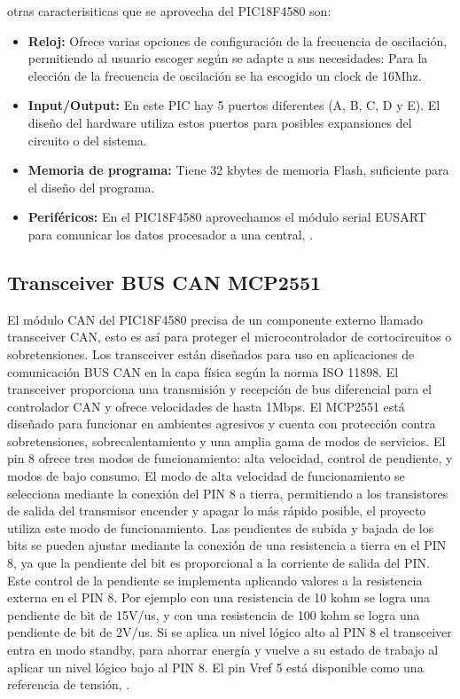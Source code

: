 otras caracterisiticas que se aprovecha del PIC18F4580 son: 
\begin{itemize}
\item {\textbf{Reloj:}} Ofrece varias opciones de configuración de la frecuencia de oscilación, permitiendo al usuario escoger según se adapte a sus necesidades:
Para la elección de la frecuencia de oscilación se ha escogido un clock de 16Mhz.
\item {\textbf{Input/Output:}} En este PIC hay 5 puertos diferentes (A, B, C, D y E). El diseño del hardware utiliza estos puertos para posibles expansiones del circuito o del sistema. 
\item {\textbf{Memoria de programa:}} Tiene 32 kbytes de memoria Flash, suficiente para el diseño del programa.
\item {\textbf{Periféricos:}} En el PIC18F4580 aprovechamos el módulo serial EUSART para comunicar los datos procesador a una central, \cite{DaP}.

\end{itemize}


\subsection{Transceiver BUS CAN MCP2551}
El módulo CAN del  PIC18F4580 precisa de un componente externo llamado transceiver CAN, esto es así para proteger el microcontrolador de cortocircuitos o sobretensiones. Los transceiver están diseñados para uso en aplicaciones de comunicación BUS CAN en la capa física según la norma ISO 11898. El transceiver proporciona una transmisión y recepción de bus diferencial para el controlador CAN y ofrece velocidades de hasta 1Mbps.
El MCP2551 está diseñado para funcionar en ambientes agresivos y cuenta con protección contra sobretensiones, sobrecalentamiento y una amplia gama de modos de servicios. El pin 8 ofrece tres modos de funcionamiento: alta velocidad, control de pendiente, y modos de bajo consumo.
El modo de alta velocidad de funcionamiento se selecciona mediante la conexión del PIN 8 a tierra, permitiendo a los transistores de salida del transmisor encender y apagar lo más rápido posible, el proyecto utiliza este modo de funcionamiento.
Las pendientes de subida y bajada de los bits se pueden ajustar mediante la conexión de una resistencia a tierra en el PIN 8, ya que la pendiente del bit es proporcional a la corriente de salida del PIN. Este control de la pendiente se implementa aplicando valores a la resistencia externa en el PIN 8. Por ejemplo con una resistencia de 10 kohm se logra una pendiente de bit de 15V/us,  y con una resistencia de 100 kohm se logra una pendiente de bit de 2V/us. Si se aplica un nivel lógico alto al PIN 8 el transceiver entra en modo standby, para ahorrar energía y vuelve a su estado de trabajo al aplicar un nivel lógico bajo al PIN 8. El pin Vref 5 está disponible como una referencia de tensión, \cite{sn}.

